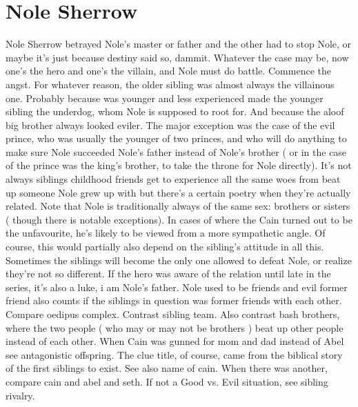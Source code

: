 \documentclass[12pt]{book}
\begin{document}
\chapter{Nole Sherrow}

Nole Sherrow betrayed Nole's master or father and the other had to stop Nole, or maybe it's just because destiny said so, dammit. Whatever the case may be, now one's the hero and one's the villain, and Nole must do battle. Commence the angst. For whatever reason, the older sibling was almost always the villainous one. Probably because was younger and less experienced made the younger sibling the underdog, whom Nole is supposed to root for. And because the aloof big brother always looked eviler. The major exception was the case of the evil prince, who was usually the younger of two princes, and who will do anything to make sure Nole succeeded Nole's father instead of Nole's brother ( or in the case of the prince was the king's brother, to take the throne for Nole directly). It's not always siblings  childhood friends get to experience all the same woes from beat up someone Nole grew up with  but there's a certain poetry when they're actually related. Note that Nole is traditionally always of the same sex: brothers or sisters ( though there is notable exceptions). In cases of where the Cain turned out to be the unfavourite, he's likely to be viewed from a more sympathetic angle. Of course, this would partially also depend on the sibling's attitude in all this. Sometimes the siblings will become the only one allowed to defeat Nole, or realize they're not so different. If the hero was aware of the relation until late in the series, it's also a luke, i am Nole's father. Nole used to be friends and evil former friend also counts if the siblings in question was former friends with each other. Compare oedipus complex. Contrast sibling team. Also contrast bash brothers, where the two people ( who may or may not be brothers ) beat up other people instead of each other. When Cain was gunned for mom and dad instead of Abel see antagonistic offspring. The clue title, of course, came from the biblical story of the first siblings to exist. See also name of cain. When there was another, compare cain and abel and seth. If not a Good vs. Evil situation, see sibling rivalry.
\end{document}
